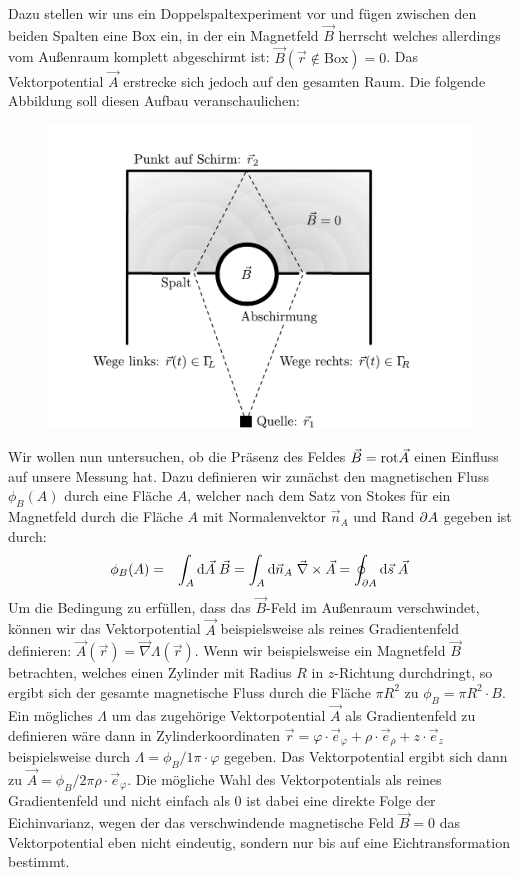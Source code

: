Dazu stellen wir uns ein Doppelspaltexperiment vor und fügen zwischen den beiden Spalten eine Box ein, in der ein Magnetfeld $\vec{B}$ herrscht welches allerdings vom Außenraum komplett abgeschirmt ist: $\vec{B}(\vec{r}\notin\text{Box}) = 0$. Das Vektorpotential $\vec{A}$ erstrecke sich jedoch auf den gesamten Raum. Die folgende Abbildung soll diesen Aufbau veranschaulichen: 
\vspace{-2ex}\begin{figure}[!h]\centering
	\includegraphics[scale=0.75]{Figs/DoppelspaltB}
\end{figure}

Wir wollen nun untersuchen, ob die Präsenz des Feldes $\vec{B}=\text{rot}\vec{A}$ einen Einfluss auf unsere Messung hat. Dazu definieren wir zunächst den magnetischen Fluss $\phi_B(A)$ durch eine Fläche $A$, welcher nach dem Satz von Stokes für ein Magnetfeld durch die Fläche $A$ mit Normalenvektor $\vec{n}_A$ und Rand $\partial A$ gegeben ist durch:
\begin{eqnarray*}
	\phi_B(A) &=& \int_A\mathrm{d}\vec{A}\;\vec{B} = \int_A\mathrm{d}\vec{n}_A\; \vec{\nabla}\times\vec{A} = \oint_{\partial A}\mathrm{d}\vec{s}\; \vec{A} 
\end{eqnarray*}
Um die Bedingung zu erfüllen, dass das $\vec{B}$-Feld im Außenraum verschwindet, können wir das Vektorpotential $\vec{A}$ beispielsweise als reines Gradientenfeld definieren: $\vec{A}(\vec{r})=\vec{\nabla}\Lambda(\vec{r})$. Wenn wir beispielsweise ein Magnetfeld $\vec{B}$ betrachten, welches einen Zylinder mit Radius $R$ in $z$-Richtung durchdringt, so ergibt sich der gesamte magnetische Fluss durch die Fläche $\pi R^2$ zu $\phi_B=\pi R^2\cdot B$. Ein mögliches $\Lambda$ um das zugehörige Vektorpotential $\vec{A}$ als Gradientenfeld zu definieren wäre dann in Zylinderkoordinaten $\vec{r}=\varphi\cdot\vec{e}_{\varphi}+\rho\cdot\vec{e}_{\rho}+z\cdot\vec{e}_{z}$ beispielsweise durch $\Lambda=\phi_B/1\pi\cdot\varphi$ gegeben. Das Vektorpotential ergibt sich dann zu $\vec{A}=\phi_B/2\pi\rho\cdot \vec{e}_{\varphi}$. Die mögliche Wahl des Vektorpotentials als reines Gradientenfeld und nicht einfach als 0 ist dabei eine direkte Folge der Eichinvarianz, wegen der das verschwindende magnetische Feld $\vec{B}=0$ das Vektorpotential eben nicht eindeutig, sondern nur bis auf eine Eichtransformation bestimmt. 

